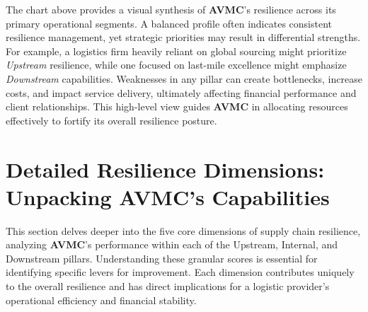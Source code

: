\documentclass[
  oneside,
  open=any,
  fontsize=11pt]{scrbook}
\begin{document}
The chart above provides a visual synthesis of \textbf{AVMC}'s
resilience across its primary operational segments. A balanced profile
often indicates consistent resilience management, yet strategic
priorities may result in differential strengths. For example, a
logistics firm heavily reliant on global sourcing might prioritize
\emph{Upstream} resilience, while one focused on last-mile excellence
might emphasize \emph{Downstream} capabilities. Weaknesses in any pillar
can create bottlenecks, increase costs, and impact service delivery,
ultimately affecting financial performance and client relationships.
This high-level view guides \textbf{AVMC} in allocating resources
effectively to fortify its overall resilience posture.

\chapter{Detailed Resilience Dimensions: Unpacking AVMC's
Capabilities}\label{detailed-resilience-dimensions-unpacking-avmcs-capabilities}

This section delves deeper into the five core dimensions of supply chain
resilience, analyzing \textbf{AVMC}'s performance within each of the
Upstream, Internal, and Downstream pillars. Understanding these granular
scores is essential for identifying specific levers for improvement.
Each dimension contributes uniquely to the overall resilience and has
direct implications for a logistic provider's operational efficiency and
financial stability.
\end{document}

